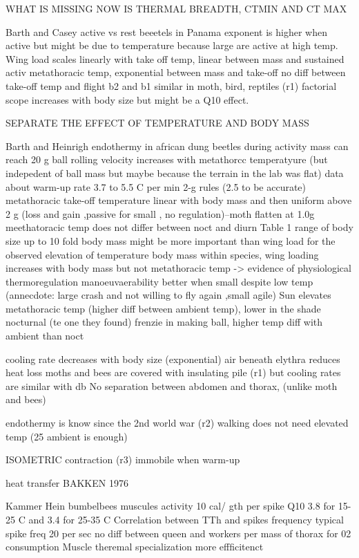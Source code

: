 WHAT IS MISSING NOW IS THERMAL BREADTH, CTMIN AND CT MAX


Barth and Casey active vs rest beeetels in Panama
exponent is higher when active but might be due to temperature because large are active at high temp.
Wing load scales linearly with take off temp,  linear between mass and sustained activ metathoracic temp, exponential between mass and  take-off
no diff between take-off temp and flight  
b2 and b1 similar in moth, bird, reptiles (r1)
factorial scope increases with body size but might be a Q10 effect.

SEPARATE THE EFFECT OF TEMPERATURE AND BODY MASS

Barth and Heinrigh endothermy in african dung beetles during activity
mass can reach 20 g
ball rolling velocity increases with metathorcc temperatyure (but indepedent of ball mass but maybe because the terrain in the lab was flat)
data about warm-up rate 3.7 to 5.5 C per min
2-g rules (2.5 to be accurate) metathoracic take-off temperature linear with body mass and then uniform above 2 g (loss and gain ,passive for small , no regulation)--moth flatten at 1.0g
meethatoracic temp does not differ between noct and diurn
Table 1 range of body size up to 10 fold 
body mass might be more important than wing load for the observed elevation of temperature body mass
within species, wing loading increases with body mass but not metathoracic temp -> evidence of physiological thermoregulation
manoeuvaerability better when small despite low temp (annecdote: large crash and not willing to fly again ,small agile)
Sun elevates metathoracic temp (higher diff between ambient temp), lower in the shade 
nocturnal (te one they found)  frenzie in making ball, higher temp diff with ambient than noct

cooling rate decreases with body size (exponential) air beneath elythra reduces heat loss  
moths and bees are covered with insulating pile (r1) but cooling rates are similar with db
No separation between abdomen and thorax, (unlike moth and bees)

endothermy is know since the 2nd world war (r2)
walking does not need elevated temp (25 ambient is enough)

ISOMETRIC contraction (r3) immobile when warm-up

heat transfer BAKKEN 1976

Kammer Hein bumbelbees muscules activity
10 cal/ gth per spike
Q10 3.8 for 15-25 C and 3.4 for 25-35 C
Correlation between TTh and  spikes frequency
typical spike freq 20 per sec
no diff between queen and workers per mass of thorax for 02 consumption
Muscle theremal specialization more effficitenct

